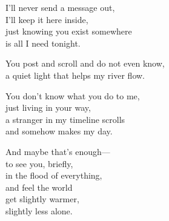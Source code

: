 \begin{lyrics}
I'll never send a message out,\\
I'll keep it here inside,\\
just knowing you exist somewhere\\
is all I need tonight.

You post and scroll and do not even know,\\
a quiet light that helps my river flow.

You don't know what you do to me,\\
just living in your way,\\
a stranger in my timeline scrolls\\
and somehow makes my day.

And maybe that's enough—\\
to see you, briefly,\\
in the flood of everything,\\
and feel the world\\
get slightly warmer,\\
slightly less alone.

\end{lyrics}

